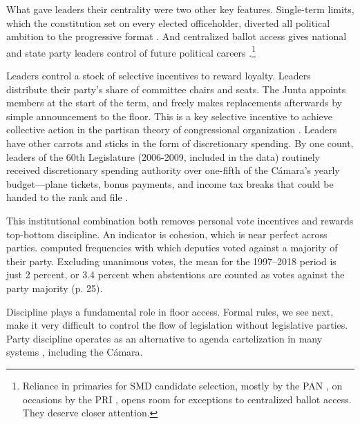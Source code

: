 \documentclass[letter,12pt]{article}
\begin{document}
What gave leaders their centrality were two other key features. Single-term limits, which the constitution set on every elected officeholder, diverted all political ambition to the progressive format \citep{schlesinger.1966}. And centralized ballot access gives national and state party leaders control of future political careers \citep{langston.2008}.\footnote{Reliance in primaries for SMD candidate selection, mostly by the PAN \citep{ascencio.kerevel.cand-sel-beh.2021}, on occasions by the PRI \citep{poire.phd.2002}, opens room for exceptions to centralized ballot access. They deserve closer attention.}

Leaders control a stock of selective incentives to reward loyalty. Leaders distribute their party's share of committee chairs and seats. The Junta appoints members at the start of the term, and freely makes replacements afterwards by simple announcement to the floor. This is a key selective incentive to achieve collective action in the partisan theory of congressional organization \citep{cox.mccubbins.1993}. Leaders have other carrots and sticks in the form of discretionary spending. By one count, leaders of the 60th Legislature (2006-2009, included in the data) routinely received discretionary spending authority over one-fifth of the Cámara's yearly budget---plane tickets, bonus payments, and income tax breaks that could be handed to the rank and file \citep{casar.2011}.

This institutional combination both removes personal vote incentives \citep{carey.shugart.1995,cain.etal.1987} and rewards top-bottom discipline. An indicator is cohesion, which is near perfect across parties. \citet{tellez-del-rio.2018} computed frequencies with which deputies voted against a majority of their party. Excluding unanimous votes, the mean for the 1997--2018 period is just 2 percent, or 3.4 percent when abstentions are counted as votes against the party majority (p. 25). 

Discipline plays a fundamental role in floor access. Formal rules, we see next, make it very difficult to control the flow of legislation without legislative parties. Party discipline operates as an alternative to agenda cartelization in many systems \citep{prata.2006}, including the Cámara. 
\end{document}

